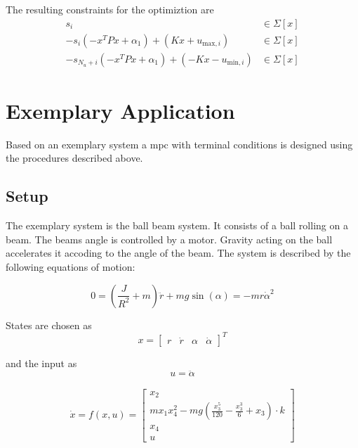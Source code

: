 \documentclass[10pt,a4paper]{article}
\begin{document}
The resulting constraints for the optimiztion are
\begin{align}
	s_{i} &\in \Sigma[x]\\
	-s_{i}(-x^TPx + \alpha_1) + (Kx + u_{\text{max},i}) &\in \Sigma[x]\\
	-s_{N_u +i}(-x^TPx + \alpha_1) + (-Kx - u_{\text{min},i}) &\in \Sigma[x]
\end{align}










\pagebreak
\section{Exemplary Application}
\label{sec:example}
Based on an exemplary system a \gls{mpc} with terminal conditions is designed using the procedures described above. 


\subsection{Setup}
The exemplary system is the ball beam system.
It consists of a ball rolling on a beam. The beams angle is controlled by a motor. Gravity acting on the ball accelerates it accoding to the angle of the beam.
The system is described by the following equations of motion:

\begin{equation}
    0 = \left(\frac{J}{R^2} + m\right)\ddot{r} + mg\sin(\alpha) = - mr\dot{\alpha}^2
\end{equation}


States are chosen as
\begin{equation}
	x = \begin{bmatrix} r & \dot{r} & \alpha & \dot{\alpha} \end{bmatrix}^T
\end{equation}

and the input as
\begin{equation}
	u = \ddot{\alpha}
\end{equation}


\begin{align*}
    \dot{x} = f(x,u) = \begin{bmatrix}
        x_2 \\
        m x_1 x_4^2 - m g \left(\frac{x_3^5}{120} - \frac{x_3^3}{6} + x_3\right) \cdot k \\
        x_4 \\
        u
    \end{bmatrix}
\end{align*}
\end{document}
